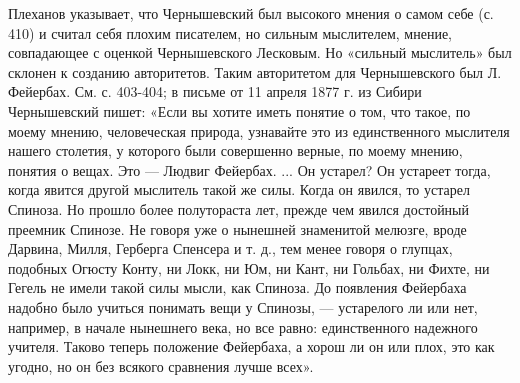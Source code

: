 Плеханов указывает, что Чернышевский был высокого мнения о самом себе (с. 410)
и считал себя плохим писателем, но сильным мыслителем, мнение, совпадающее с
оценкой Чернышевского Лесковым. Но «сильный мыслитель» был склонен к созданию
авторитетов. Таким авторитетом для Чернышевского был Л. Фейербах. См. с.
403-404; в письме от 11 апреля 1877 г. из Сибири Чернышевский пишет: «Если вы
хотите иметь понятие о том, что такое, по моему мнению, человеческая природа,
узнавайте это из единственного мыслителя нашего столетия, у которого были
совершенно верные, по моему мнению, понятия о вещах. Это --- Людвиг Фейербах. ...
Он устарел? Он устареет тогда, когда явится другой мыслитель такой же силы.
Когда он явился, то устарел Спиноза. Но прошло более полутораста лет, прежде
чем явился достойный преемник Спинозе. Не говоря уже о нынешней знаменитой
мелюзге, вроде Дарвина, Милля, Герберга Спенсера и т. д.,
тем менее говоря о глупцах, подобных Огюсту Конту, ни Локк, ни Юм, ни Кант, ни
Гольбах, ни Фихте, ни Гегель не имели такой силы мысли, как Спиноза. До
появления Фейербаха надобно было учиться понимать вещи у Спинозы, --- устарелого
ли или нет, например, в начале нынешнего века, но все равно: единственного
надежного учителя. Таково теперь положение Фейербаха, а хорош ли он или плох,
это как угодно, но он без всякого сравнения лучше всех».

